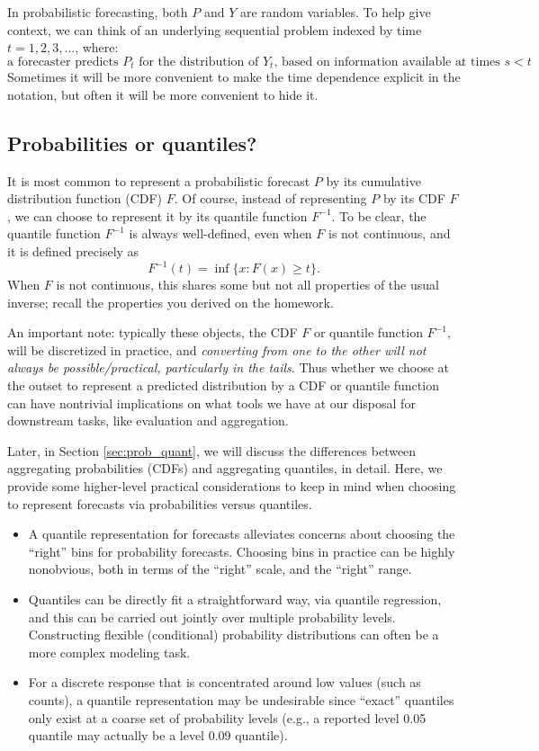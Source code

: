 \documentclass{article}
\begin{document}
In probabilistic forecasting, both $P$ and $Y$ are random variables. To help
give context, we can think of an underlying sequential problem indexed by time
$t=1,2,3,\dots$, where:
\[
\text{a forecaster predicts $P_t$ for the distribution of $Y_t$, based on
  information available at times $s<t$}.
\]
Sometimes it will be more convenient to make the time dependence explicit in the
notation, but often it will be more convenient to hide it. 

\subsection{Probabilities or quantiles?}

It is most common to represent a probabilistic forecast $P$ by its cumulative
distribution function (CDF) $F$. Of course, instead of representing $P$ by its
CDF $F$, we can choose to represent it by its quantile function
$F^{-1}$. To be clear, the quantile function $F^{-1}$ is always well-defined,
even when $F$ is not continuous, and it is defined precisely as
\[
F^{-1}(t) = \inf\{ x : F(x) \geq t\}.
\]
When $F$ is not continuous, this shares some but not all properties of the 
usual inverse; recall the properties you derived on the homework.

An important note: typically these objects, the CDF $F$ or quantile function
$F^{-1}$, will be discretized in practice, and \emph{converting from one to the
  other will not always be possible/practical, particularly in the tails}. Thus
whether we choose at the outset to represent a predicted distribution by a CDF
or quantile function can have nontrivial implications on what tools we have at
our disposal for downstream tasks, like evaluation and aggregation.

Later, in Section \ref{sec:prob_quant}, we will discuss the differences between
aggregating probabilities (CDFs) and aggregating quantiles, in detail. Here, we
provide some higher-level practical considerations to keep in mind when choosing
to represent forecasts via probabilities versus quantiles.  

\begin{itemize}
\item A quantile representation for forecasts alleviates concerns about choosing
  the ``right'' bins for probability forecasts. Choosing bins in practice can be
  highly nonobvious, both in terms of the ``right''  scale, and the ``right''
  range.  

\item Quantiles can be directly fit a straightforward way, via quantile
  regression, and this can be carried out jointly over multiple probability
  levels. Constructing flexible (conditional) probability distributions can
  often be a more complex modeling task.  

\item For a discrete response that is concentrated around low values (such as 
  counts), a quantile representation may be undesirable since ``exact''
  quantiles only exist at a coarse set of probability levels (e.g., a reported
  level 0.05 quantile may actually be a level 0.09 quantile).     
\end{itemize}
\end{document}
